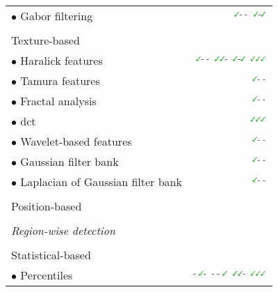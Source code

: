 \begin{table}
\begin{tabular}{l r}
  \quad \quad \quad $\bullet$ Gabor filtering & $^{\text{{\cmarksmall}- -}}$\cite{Tiwari2012,Viswanath2008,Viswanath2012} $^{\text{{\cmarksmall}-{\cmarksmall}}}$\cite{khalvati2015automated,chung2015prostate}  \\ \\ [-1.5ex]
  \quad \quad Texture-based & \\
  \quad \quad \quad $\bullet$ Haralick features & $^{\text{{\cmarksmall}- -}}$\cite{Antic2013,Tiwari2009a,Tiwari2010,Tiwari2013,Viswanath2008,Viswanath2009,Viswanath2012,trigui2016classification,rampun2015computer,rampun2016computer,rampun2016quantitative} $^{\text{{\cmarksmall}{\cmarksmall}-}}$\cite{Viswanath2011} $^{\text{{\cmarksmall}-{\cmarksmall}}}$\cite{cameron2014multiparametric,cameron2016maps,khalvati2015automated,chung2015prostate} $^{\text{{\cmarksmall}{\cmarksmall}{\cmarksmall}}}$\cite{Litjens2012,Niaf2011,Niaf2012,lehaire2014computer} \\
  \quad \quad \quad $\bullet$ Tamura features & $^{\text{{\cmarksmall}- -}}$\cite{rampun2016computer,rampun2016quantitative,rampun2015computer} \\
  \quad \quad \quad $\bullet$ Fractal analysis & $^{\text{{\cmarksmall}- -}}$\cite{Lopes2011,Lv2009} \\
  \quad \quad \quad $\bullet$ \acs*{dct} & $^{\text{{\cmarksmall}{\cmarksmall}{\cmarksmall}}}$\cite{Chan2003} \\
  \quad \quad \quad $\bullet$ Wavelet-based features & $^{\text{{\cmarksmall}- -}}$\cite{Viswanath2012} \\
  \quad \quad \quad $\bullet$ Gaussian filter bank & $^{\text{{\cmarksmall}- -}}$\cite{Litjens2014,rampun2016computer,rampun2016quantitative,rampun2015computer} \\
  \quad \quad \quad $\bullet$ Laplacian of Gaussian filter bank & $^{\text{{\cmarksmall}- -}}$\cite{rampun2016computer,rampun2016quantitative,rampun2015computer} \\ \\ [-1.5ex]
  \quad \quad Position-based & \cite{Chan2003,Litjens2011,Litjens2012,Litjens2014} \\ \\ [-1.5ex]
  \quad \textit{Region-wise detection} &  \\ \\ [-1.5ex]
  \quad \quad Statistical-based & \\
  \quad \quad \quad $\bullet$ Percentiles & $^{\text{- {\cmarksmall}-}}$\cite{Vos2008a}  $^{\text{- - {\cmarksmall}}}$\cite{Antic2013,Peng2013} $^{\text{{\cmarksmall}{\cmarksmall}-}}$\cite{Vos2010} $^{\text{{\cmarksmall}{\cmarksmall}{\cmarksmall}}}$\cite{Litjens2011,Litjens2012,Litjens2014,Niaf2011,Niaf2012,Vos2012,lehaire2014computer} \\

\end{tabular}
\end{table}
